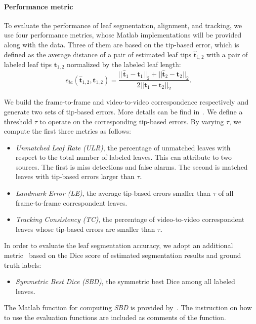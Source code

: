 \paragraph{Performance metric}
To evaluate the performance of leaf segmentation, alignment, and tracking, we use four performance metrics, whose Matlab implementations will be provided along with the data.
Three of them are based on the tip-based error, which is defined as the average distance of a pair of estimated leaf tips $\hat{\bm{t}}_{1,2}$ with a pair of labeled leaf tips $ \bm{t}_{1,2}$ normalized by the labeled leaf length:
\begin {equation}
e_{la}(\hat{\bm{t}}_{1,2}, \bm{t}_{1,2}) = \frac{||\hat{\bm{t}}_1-{\bm{t}}_1||_2 + ||\hat{\bm{t}}_2-{\bm{t}}_2||_2}{2 ||\bm{t}_1-\bm{t}_2||_2}.
\label{eqn:tipError}
\end{equation}

We build the frame-to-frame and video-to-video correspondence respectively and generate two sets of tip-based errors.
More details can be find in~\cite{yin2014b}.
We define a threshold $\tau$ to operate on the corresponding tip-based errors.
By varying $\tau$, we compute the first three metrics as follows:
\begin{itemize}
  \item {\it{Unmatched Leaf Rate (ULR)}}, the percentage of unmatched leaves with respect to the total number of labeled leaves.
This can attribute to two sources.
The first is miss detections and false alarms.
The second is matched leaves with tip-based errors larger than $\tau$.
  \item {\it{Landmark Error (LE)}}, the average tip-based errors smaller than $\tau$ of all frame-to-frame correspondent leaves.
  \item {\it{Tracking Consistency (TC)}}, the percentage of video-to-video correspondent leaves whose tip-based errors are smaller than $\tau$.
\end{itemize}

In order to evaluate the leaf segmentation accuracy, we adopt an additional metric~\cite{scharr2014annotated} based on the Dice score of estimated segmentation results and ground truth labels:
\begin{itemize}
  \item {\it{Symmetric Best Dice (SBD)}}, the symmetric best Dice among all labeled leaves.
\end{itemize}
The Matlab function for computing {\it{SBD}} is provided by~\cite{scharr2014annotated}.
The instruction on how to use the evaluation functions are included as comments of the function.


